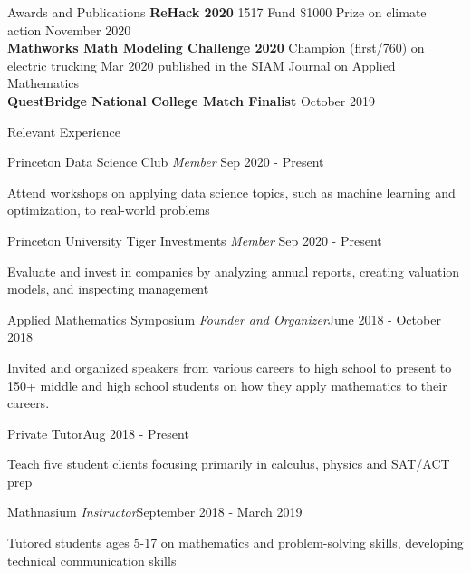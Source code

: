 \documentclass{resume} %
\begin{document}
\begin{rSection}{Awards and Publications}
\textbf{ReHack 2020} 1517 Fund \$1000 Prize
\href{https://devpost.com/software/rehome-cgpw0j}{\color{blue} \underline{}} on climate action \hfill November 2020
\\
\textbf{Mathworks Math Modeling Challenge 2020} Champion (first/760) 
\href{https://www.siam.org/Portals/0/Publications/SIURO/Vol13/S133509PDF.pdf?ver=2020-08-20-120041-480}{\color{blue} \underline{}} on electric trucking \hfill Mar 2020 \newline published in the SIAM Journal on Applied Mathematics
\\
\textbf{QuestBridge National College Match Finalist} \hfill October 2019
\end{rSection}

\begin{rSection}{Relevant Experience}

\begin{rSubsection}
{Princeton Data Science Club \normalfont\em Member} {Sep 2020 - Present}{}{}
\item Attend workshops on applying data science topics, such as machine learning and optimization, to real-world problems
\end{rSubsection}

\begin{rSubsection}
{Princeton University Tiger Investments \normalfont\em Member} {Sep 2020 - Present}{}{}
\item Evaluate and invest in companies by analyzing annual reports, creating valuation models, and inspecting management
\end{rSubsection}

\begin{rSubsection}
{Applied Mathematics Symposium \normalfont\em Founder and Organizer}{June 2018 - October 2018}{}{}
\item Invited and organized speakers from various careers to high school to present to 150+ middle and high school students on how they apply mathematics to their careers.
\end{rSubsection}

\begin{rSubsection}
{Private Tutor}{Aug 2018 - Present}{}{}
\item Teach five student clients focusing primarily in calculus, physics and SAT/ACT prep
\end{rSubsection}

\begin{rSubsection}
{Mathnasium \normalfont\em Instructor}{September 2018 - March 2019}{}{}
    \item Tutored students ages 5-17 on mathematics and problem-solving skills, developing technical communication skills
 
\end{rSubsection} 
\end{rSection}
\end{document}
